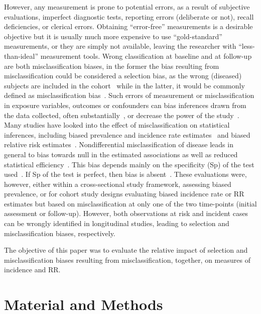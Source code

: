 \documentclass[utf8]{frontiersSCNS}\usepackage[]{graphicx}\usepackage[]{color}
\begin{document}
However, any measurement is prone to potential errors, as a result of subjective
evaluations, imperfect diagnostic tests, reporting errors (deliberate or not),
recall deficiencies, or clerical errors.
Obtaining ``error-free'' measurements is a desirable objective but it is
usually much more expensive to use ``gold-standard'' measurements, or they
are simply not available, leaving the researcher with ``less-than-ideal''
measurement tools.
Wrong classification at baseline and at follow-up are both misclassification
biases, in the former the bias resulting from misclassification could be
considered a selection bias, as the wrong (diseased) subjects are included in
the cohort~\citep{Rothman2012} while in the latter, it would be commonly defined
as misclassification bias~\citep{Delgado-Rodriguez2004}.
Such errors of measurement or misclassification in exposure variables, outcomes
or confounders can bias inferences drawn from the data collected, often
substantially~\citep{Quade1980}, or decrease the power of the
study~\citep{Bross1954,WHITE_1986}.
Many studies have looked into the effect of misclassification on statistical
inferences, including biased prevalence and incidence rate
estimates~\citep{Rogan1978,Quade1980} and biased relative risk
estimates~\citep{Barron1977,Greenland1980}.
Nondifferential misclassification of disease leads in general to bias towards
null in the estimated associations as well as reduced statistical
efficiency~\citep{Bross1954,Barron1977,Copeland1977}.
This bias depends mainly on the specificity (Sp) of the test
used~\citep{Copeland1977}.
If Sp of the test is perfect, then bias is absent~\citep{Poole1985}.
These evaluations were, however, either within a cross-sectional study
framework, assessing biased prevalence, or for cohort study designs evaluating
biased incidence rate or RR estimates but based on misclassification at only one
of the two time-points (initial assessment or follow-up).
However, both observations at risk and incident cases can be wrongly identified
in longitudinal studies, leading to selection and misclassification biases,
respectively.

The objective of this paper was to evaluate the relative impact of selection and
misclassification biases resulting from misclassification, together, on measures
of incidence and RR.

\section{Material and Methods}
\end{document}
